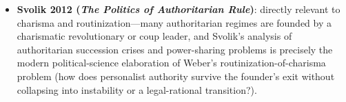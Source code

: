 \documentclass[12pt]{article}
\begin{document}
\begin{itemize}[leftmargin=*, itemsep=4pt]
    \item \textbf{Svolik 2012 (\textit{The Politics of Authoritarian Rule})}: directly relevant to charisma and routinization---many authoritarian regimes are founded by a charismatic revolutionary or coup leader, and Svolik's analysis of authoritarian succession crises and power-sharing problems is precisely the modern political-science elaboration of Weber's routinization-of-charisma problem (how does personalist authority survive the founder's exit without collapsing into instability or a legal-rational transition?).
\end{itemize}
\end{document}
